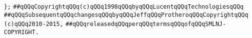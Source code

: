 \newline
\newline
\verb|};|\newline
\newline
\newline
\newline
\verb|##qQQqCopyrightqQQq(c)qQQq1998qQQqbyqQQqLucentqQQqTechnologiesqQQq|\newline
\verb|##qQQqSubsequentqQQqchangesqQQqbyqQQqJeffqQQqProtheroqQQqCopyrightqQQq(c)qQQq2010-2015,|\newline
\verb|##qQQqreleasedqQQqperqQQqtermsqQQqofqQQqSMLNJ-COPYRIGHT.|\newline

